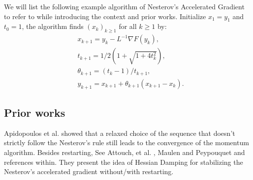 \documentclass[12pt]{article}
\begin{document}
        We will list the following example algorithm of Nesterov's Accelerated Gradient to refer to while introducing the context and prior works.
        Initialize $x_1 = y_1$ and $t_0 = 1$, the algorithm finds $(x_k)_{k \ge 1}$ for all $k \ge 1$ by:
        \begin{align}
            & x_{k + 1} = y_k - L^{-1}\nabla F(y_k),
            \\
            & t_{k + 1} = 1/2\left(1 + \sqrt{1 + 4t_{k}^2}\right),
            \\
            & \theta_{k + 1} = (t_{k} - 1)/t_{k + 1},
            \\
            & y_{k + 1} = x_{k + 1} + \theta_{k + 1}(x_{k + 1} - x_k).
        \end{align}\label{eqn:example-algorithm}

        \subsection{Prior works}
            Apidopoulos et al. \cite{apidopoulos_convergence_2018} showed that a relaxed choice of the sequence that doesn't strictly follow the Nesterov's rule still leads to the convergence of the momentum algorithm.
            Besides restarting, See Attouch, et al. \cite{attouch_first-order_2022}, Maulen and Peypouquet \cite{maulen_speed_2023} and references within.
            They present the idea of Hessian Damping for stabilizing the Nesterov's accelerated gradient without/with restarting.
\end{document}
